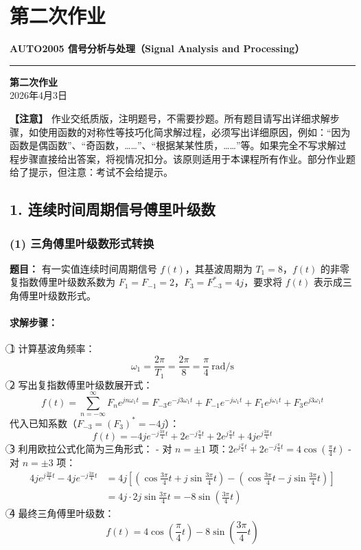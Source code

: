 \section{第二次作业}
\noindent \textbf{AUTO2005 信号分析与处理（Signal Analysis and Processing）}
\vspace{0.5em}
\hrule
\vspace{1em}
\begin{center}
    \Large\textbf{第二次作业} \\
    \normalsize 2026年4月3日
\end{center}
\vspace{1em}
\noindent \textbf{【注意】} 作业交纸质版，注明题号，不需要抄题。所有题目请写出详细求解步骤，如使用函数的对称性等技巧化简求解过程，必须写出详细原因，例如：“因为函数是偶函数”、“奇函数，……”、“根据某某性质，……”等。如果完全不写求解过程步骤直接给出答案，将视情况扣分。该原则适用于本课程所有作业。部分作业题给了提示，但注意：考试不会给提示。
\vspace{1em}

\subsection{1. 连续时间周期信号傅里叶级数}
\subsubsection{(1) 三角傅里叶级数形式转换}
\textbf{题目：} 有一实值连续时间周期信号 \( f(t) \)，其基波周期为 \( T_1=8 \)，\( f(t) \) 的非零复指数傅里叶级数系数为 \( F_1=F_{-1}=2 \)，\( F_3=F_{-3}^*=4j \)，要求将 \( f(t) \) 表示成三角傅里叶级数形式。

\paragraph{求解步骤：}
\textcircled{1} 计算基波角频率：
\[
\omega_1 = \frac{2\pi}{T_1} = \frac{2\pi}{8} = \frac{\pi}{4} \ \mathrm{rad/s}
\]
\textcircled{2} 写出复指数傅里叶级数展开式：
\[
f(t) = \sum_{n=-\infty}^{\infty} F_n e^{jn\omega_1 t} = F_{-3}e^{-j3\omega_1 t} + F_{-1}e^{-j\omega_1 t} + F_1e^{j\omega_1 t} + F_3e^{j3\omega_1 t}
\]
代入已知系数（\( F_{-3} = (F_3)^* = -4j \)）：
\[
f(t) = -4j e^{-j\frac{3\pi}{4}t} + 2e^{-j\frac{\pi}{4}t} + 2e^{j\frac{\pi}{4}t} + 4j e^{j\frac{3\pi}{4}t}
\]
\textcircled{3} 利用欧拉公式化简为三角形式：
- 对 \( n=\pm1 \) 项：\( 2e^{j\frac{\pi}{4}t} + 2e^{-j\frac{\pi}{4}t} = 4\cos\left(\frac{\pi}{4}t\right) \)
- 对 \( n=\pm3 \) 项：
\[
\begin{aligned}
4j e^{j\frac{3\pi}{4}t} - 4j e^{-j\frac{3\pi}{4}t} &= 4j\left[\left(\cos\frac{3\pi}{4}t + j\sin\frac{3\pi}{4}t\right) - \left(\cos\frac{3\pi}{4}t - j\sin\frac{3\pi}{4}t\right)\right] \\
&= 4j \cdot 2j\sin\frac{3\pi}{4}t = -8\sin\left(\frac{3\pi}{4}t\right)
\end{aligned}
\]
\textcircled{4} 最终三角傅里叶级数：
\[
\boxed{f(t) = 4\cos\left(\frac{\pi}{4}t\right) - 8\sin\left(\frac{3\pi}{4}t\right)}
\]

